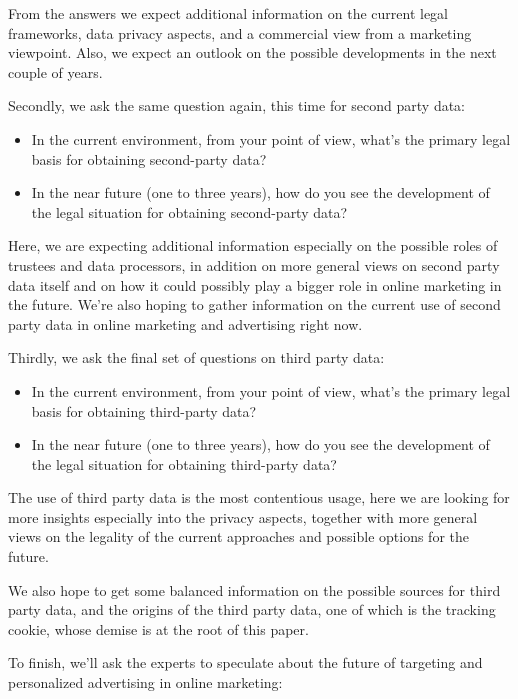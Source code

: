 From the answers we expect additional information on the current legal frameworks, data privacy aspects, and a commercial view from a marketing viewpoint. Also, we expect an outlook on the possible developments in the next couple of years.
 
Secondly, we ask the same question again, this time for second party data:

\begin{itemize} 
 \item In the current environment, from your point of view, what's the primary legal basis for obtaining second-party data?
 \item In the near future (one to three years), how do you see the development of the legal situation for obtaining second-party data?
\end{itemize}

Here, we are expecting additional information especially on the possible roles of trustees and data processors, in addition on more general views on second party data itself and on how it could possibly play a bigger role in online marketing in the future. We're also hoping to gather information on the current use of second party data in online marketing and advertising right now.
 
Thirdly, we ask the final set of questions on third party data:

\begin{itemize} 
 \item In the current environment, from your point of view, what's the primary legal basis for obtaining third-party data?
 \item In the near future (one to three years), how do you see the development of the legal situation for obtaining third-party data?
\end{itemize} 
 
The use of third party data is the most contentious usage, here we are looking for more insights especially into the privacy aspects, together with more general views on the legality of the current approaches and possible options for the future.

We also hope to get some balanced information on the possible sources for third party data, and the origins of the third party data, one of which is the tracking cookie, whose demise is at the root of this paper.

To finish, we'll ask the experts to speculate about the future of targeting and personalized advertising in online marketing:
 
